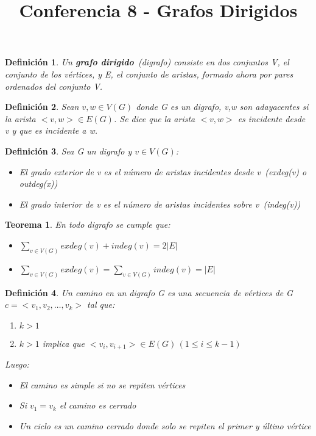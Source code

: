 \documentclass[a4paper,1pt]{report}
\title{Conferencia 8 - Grafos Dirigidos}
\author{}
\newtheorem*{teo}{Teorema}
\newtheorem*{dfn}{Definición}
\begin{document}
\maketitle

\begin{dfn}
 Un \textbf{grafo dirigido}~(digrafo) consiste en dos conjuntos V, el conjunto de los vértices, y E, el conjunto de aristas, formado ahora por pares ordenados del conjunto V.
\end{dfn}

\begin{dfn}
 Sean $v,w\in V(G)$ donde G es un digrafo, v,w son adayacentes si la arista $<v,w>\in E(G)$. Se dice que la arista $<v,w>$ es incidente desde v y que es incidente a w.
\end{dfn}

\begin{dfn}
 Sea G un digrafo y $v\in V(G)$:
 \begin{itemize}
  \item El grado exterior de v es el número de aristas incidentes desde v~(exdeg(v) o outdeg(x))
  \item El grado interior de v es el número de aristas incidentes sobre v~(indeg(v))
 \end{itemize}
\end{dfn}

\begin{teo}
 En todo digrafo se cumple que:
 \begin{itemize}
  \item $\sum_{v \in V(G)}exdeg(v)+indeg(v)=2|E|$
  \item $\sum_{v \in V(G)}exdeg(v)=\sum_{v \in V(G)}indeg(v)=|E|$
 \end{itemize}

\end{teo}

\begin{dfn}
 Un camino en un digrafo G es una secuencia de vértices de G $c=<v_1,v_2,\dots,v_k>$ tal que:
 \begin{enumerate}
  \item $k>1$
  \item $k>1$ implica que $<v_i,v_{i+1}>\in E(G)\, (1\leq i \leq k-1)$
 \end{enumerate}
Luego:
\begin{itemize}
 \item El camino es simple si no se repiten vértices
 \item Si $v_1=v_k$ el camino es cerrado
 \item Un ciclo es un camino cerrado donde solo se repiten el primer y últino vértice
\end{itemize}

\end{dfn}
\end{document}
